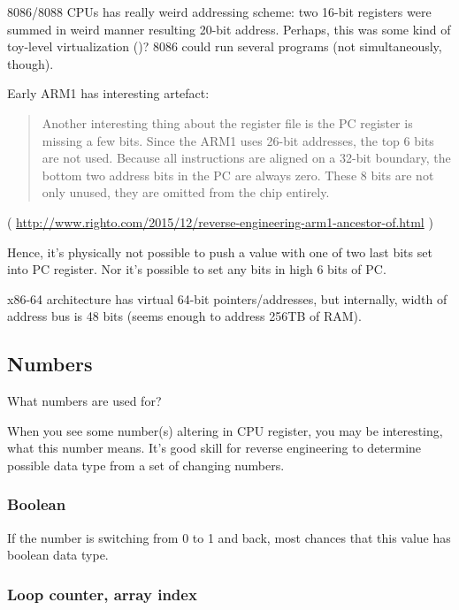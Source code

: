 8086/8088 CPUs has really weird addressing scheme:
two 16-bit registers were summed in weird manner resulting 20-bit address.
Perhaps, this was some kind of toy-level virtualization ()?
8086 could run several programs (not simultaneously, though).

Early ARM1 has interesting artefact:

\begin{framed}
\begin{quotation}
Another interesting thing about the register file is the PC register is missing a few bits. Since the ARM1 uses 26-bit addresses, the top 6 bits are not used. Because all instructions are aligned on a 32-bit boundary, the bottom two address bits in the PC are always zero. These 8 bits are not only unused, they are omitted from the chip entirely.
\end{quotation}
\end{framed}

( \url{http://www.righto.com/2015/12/reverse-engineering-arm1-ancestor-of.html} )

Hence, it's physically not possible to push a value with one of two last bits set into PC register.
Nor it's possible to set any bits in high 6 bits of PC.

x86-64 architecture has virtual 64-bit pointers/addresses, but internally, width of address bus is 48 bits
(seems enough to address 256TB of \ac{RAM}).

\subsection{Numbers}

What numbers are used for?

When you see some number(s) altering in CPU register, you may be interesting, what this number means.
It's good skill for reverse engineering to determine possible data type from a set of changing numbers.

\subsubsection{Boolean}

If the number is switching from 0 to 1 and back, most chances that this value has boolean data type.

\subsubsection{Loop counter, array index}

